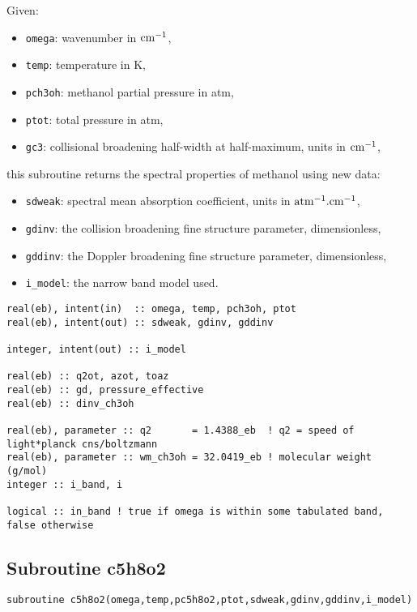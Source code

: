  Given:
\begin{itemize}
 \item \verb=omega=: wavenumber in $\rm cm^{-1}$,
 \item \verb=temp=: temperature in K,
 \item \verb=pch3oh=: methanol partial pressure in atm,
 \item \verb=ptot=: total pressure in atm,
 \item \verb=gc3=: collisional broadening half-width at half-maximum, units in $\rm cm^{-1}$,
\end{itemize}
this subroutine returns the spectral properties of methanol using new data:
\begin{itemize}
 \item \verb=sdweak=: spectral mean absorption coefficient, units in $\rm atm^{-1}.cm^{-1}$,
 \item \verb=gdinv=: the collision broadening fine structure parameter, dimensionless,
 \item \verb=gddinv=: the Doppler broadening fine structure parameter, dimensionless,
 \item \verb=i_model=: the narrow band model used.
\end{itemize}

\begin{lstlisting}
real(eb), intent(in)  :: omega, temp, pch3oh, ptot
real(eb), intent(out) :: sdweak, gdinv, gddinv

integer, intent(out) :: i_model

real(eb) :: q2ot, azot, toaz
real(eb) :: gd, pressure_effective
real(eb) :: dinv_ch3oh

real(eb), parameter :: q2       = 1.4388_eb  ! q2 = speed of light*planck cns/boltzmann
real(eb), parameter :: wm_ch3oh = 32.0419_eb ! molecular weight (g/mol)
integer :: i_band, i

logical :: in_band ! true if omega is within some tabulated band, false otherwise
\end{lstlisting}

\subsection{Subroutine c5h8o2}
\label{sub:c5h8o2}

\begin{lstlisting}
subroutine c5h8o2(omega,temp,pc5h8o2,ptot,sdweak,gdinv,gddinv,i_model)
\end{lstlisting}

